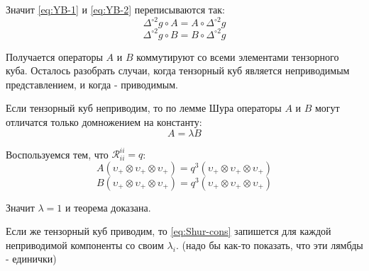 \documentclass[12pt,a4paper]{article}
\begin{document}
Значит \eqref{eq:YB-1} и \eqref{eq:YB-2} переписываются так:
\begin{equation}
    \Delta^{\circ 2} g \circ A = A \circ \Delta^{\circ 2} g
\end{equation}
\begin{equation}
    \Delta^{\circ 2} g \circ B = B \circ \Delta^{\circ 2} g
\end{equation}

Получается операторы $A$ и $B$ коммутируют со всеми элементами
тензорного куба. Осталось разобрать случаи, когда тензорный куб
является неприводимым представлением, и когда - приводимым.

Если тензорный куб неприводим, то по лемме Шура операторы $A$ и $B$
могут отличатся только домножением на константу:
\begin{equation}
    A = \lambda B
    \label{eq:Shur-cons}
\end{equation}

Воспользуемся тем, что $\mathcal{R}^{ii}_{ii} = q$:
\begin{equation}
    A(\upsilon_+ \otimes \upsilon_+ \otimes \upsilon_+) = q^3 (\upsilon_+ \otimes \upsilon_+ \otimes \upsilon_+)
\end{equation}
\begin{equation}
    B(\upsilon_+ \otimes \upsilon_+ \otimes \upsilon_+) = q^3 (\upsilon_+ \otimes \upsilon_+ \otimes \upsilon_+)
\end{equation}

Значит $\lambda = 1$ и теорема доказана.

Если же тензорный куб приводим, то \eqref{eq:Shur-cons} запишется
для каждой неприводимой компоненты со своим $\lambda_i$. (надо бы
как-то показать, что эти лямбды - единички)
\printbibliography
\end{document}
